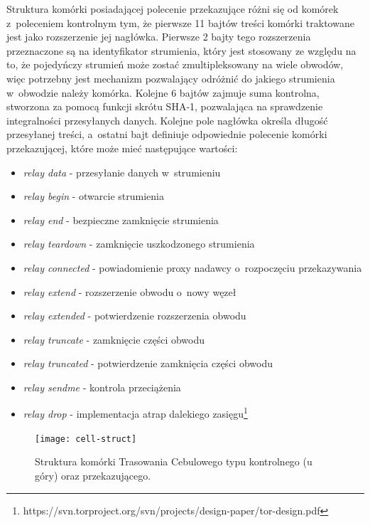 Struktura komórki posiadającej polecenie przekazujące różni się od komórek z~poleceniem kontrolnym tym, że pierwsze 11 bajtów treści komórki traktowane jest jako rozszerzenie jej nagłówka. Pierwsze 2 bajty tego rozszerzenia przeznaczone są na identyfikator strumienia, który jest stosowany ze względu na to, że pojedyńczy strumień może zostać zmultipleksowany na wiele obwodów, więc potrzebny jest mechanizm pozwalający odróżnić do jakiego strumienia w~obwodzie należy komórka. Kolejne 6 bajtów zajmuje suma kontrolna, stworzona za pomocą funkcji skrótu SHA-1, pozwalająca na sprawdzenie integralności przesyłanych danych. Kolejne pole nagłówka określa długość przesyłanej treści, a~ostatni bajt definiuje odpowiednie polecenie komórki przekazującej, które może mieć następujące wartości:

\begin{itemize}
\setlength\itemsep{0mm}
 \item \textit{relay data} - przesyłanie danych w~strumieniu
 \item \textit{relay begin} - otwarcie strumienia
 \item \textit{relay end} - bezpieczne zamknięcie strumienia
 \item \textit{relay teardown} - zamknięcie uszkodzonego strumienia
 \item \textit{relay connected} - powiadomienie proxy nadawcy o~rozpoczęciu przekazywania
 \item \textit{relay extend} - rozszerzenie obwodu o~nowy węzeł
 \item \textit{relay extended} - potwierdzenie rozszerzenia obwodu
 \item \textit{relay truncate} - zamknięcie części obwodu
 \item \textit{relay truncated} - potwierdzenie zamknięcia części obwodu
 \item \textit{relay sendme} - kontrola przeciążenia
 \item \textit{relay drop} - implementacja atrap dalekiego zasięgu\footnote{https://svn.torproject.org/svn/projects/design-paper/tor-design.pdf\label{link:tor-design}}
\end{itemize}

\begin{figure}
 \centering
 \texttt{[image: cell-struct]}
 \caption[Caption for LOR]{Struktura komórki Trasowania Cebulowego typu kontrolnego (u góry) oraz przekazującego.\footnotemark}
 \label{rys:cell}
\end{figure}

